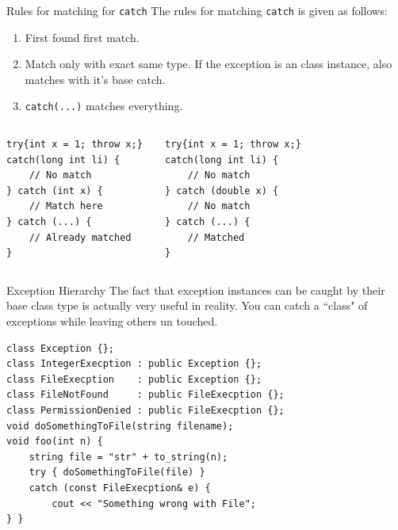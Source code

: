 \begin{frame}[fragile]{Rules for matching for \texttt{catch}}
The rules for matching \texttt{catch} is given as follows:
\begin{enumerate}
	\item First found first match.
	\item Match only with \alert{exact} same type. If the exception is an class instance, also matches with it's base catch.
	\item \texttt{catch(...)} matches everything.
\end{enumerate}
\begin{columns}

\vspace{-0.2in}
\begin{verbatim}
try{int x = 1; throw x;} 
catch(long int li) {
    // No match
} catch (int x) {
    // Match here
} catch (...) {
    // Already matched
}
\end{verbatim}

	
\vspace{-0.2in}
\begin{verbatim}
try{int x = 1; throw x;}
catch(long int li) {
    // No match
} catch (double x) {
    // No match
} catch (...) {
    // Matched
}
\end{verbatim}

\end{columns}
\end{frame}

\begin{frame}[fragile]{Exception Hierarchy}
The fact that exception instances can be caught by their base class type is actually very useful in reality. You can catch a ``class" of exceptions while leaving others un touched.
\begin{verbatim}
class Exception {};
class IntegerExecption : public Exception {};
class FileExecption    : public Exception {};
class FileNotFound     : public FileExecption {};
class PermissionDenied : public FileExecption {};
void doSomethingToFile(string filename);
void foo(int n) {
    string file = "str" + to_string(n);
    try { doSomethingToFile(file) }
    catch (const FileExecption& e) {
    	cout << "Something wrong with File"; 
} }
\end{verbatim}
\end{frame}

